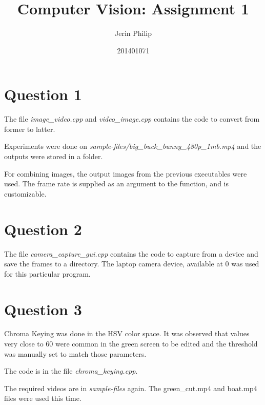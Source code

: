 \documentclass{report}
\author{Jerin Philip}
\title{Computer Vision: Assignment 1}
\date{201401071}
\begin{document}
\maketitle

\section{Question 1}
The file \emph{image\_video.cpp} and \emph{video\_image.cpp}
contains the code to convert from former to latter. 

Experiments were done on \emph{sample-files/big\_buck\_bunny\_480p\_1mb.mp4} and the
outputs were stored in a folder.

For combining images, the output images from the previous executables
were used. The frame rate is supplied as an argument to the function,
and is customizable.

\section{Question 2}
The file \emph{camera\_capture\_gui.cpp} contains the code to capture
from a device and save the frames to a directory. The laptop camera
device, available at $0$ was used for this particular program. 

\section{Question 3}
Chroma Keying was done in the HSV color space. It was observed that
values very close to 60 were common in the green screen to be edited and
the threshold was manually set to match those parameters.

The code is in the file \emph{chroma\_keying.cpp}.

The required videos are in \emph{sample-files} again. The green\_cut.mp4 and boat.mp4 files were used this time.
\end{document}
